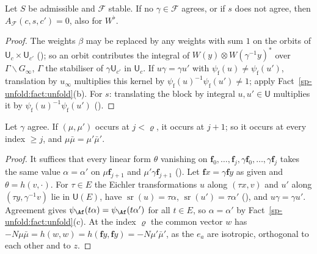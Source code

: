 \begin{lemma}\label{sp-unfold:lem:char}
Let $S$ be admissible and $\mathcal F$ stable. If no $\gamma\in\mathcal F$ agrees, or if $s$ does not agree, then
$A_{\mathcal F}(c,s,c')=0$, also for $W^\flat$.
\end{lemma}

\begin{proof}
The weights $\beta$ may be replaced by any weights with sum $1$ on the orbits of $\mathsf
U_c\times\mathsf U_{c'}$ (); so an orbit contributes
the integral of $W(y)\otimes W(\gamma^{-1}y)^*$ over $\Gamma\backslash G_\infty$, $\Gamma$ the
stabiliser of $\gamma\mathsf U_{c'}$ in $\mathsf U_c$. If $u\gamma=\gamma u'$ with
$\psi_{\mathrm f}(u)\ne\psi_{\mathrm f}(u')$, translation by $u_\infty$ multiplies this kernel by
$\psi_{\mathrm f}(u)^{-1}\psi_{\mathrm f}(u')\ne1$; apply Fact~\ref{sp-unfold:fact:unfold}(b). For $s$: translating the
block by integral $u,u'\in\mathsf U$ multiplies it by $\psi_{\mathrm f}(u)^{-1}\psi_{\mathrm f}(u')$
().
\end{proof}

\begin{lemma}\label{sp-unfold:lem:climb}
Let $\gamma$ agree. If $(\mu,\mu')$ occurs at $j<\varrho$, it occurs at $j+1$; so it occurs at every
index $\ge j$, and $\mu\bar\mu=\mu'\bar\mu'$.
\end{lemma}

\begin{proof}
It suffices that every linear form $\theta$ vanishing on $\mathbf f_0,\dots,\mathbf f_j,\gamma\mathbf
f_0,\dots,\gamma\mathbf f_j$ takes the same value $\alpha=\alpha'$ on $\mu\mathbf f_{j+1}$ and
$\mu'\gamma\mathbf f_{j+1}$ (). Let $\mathbf
fx=\gamma\mathbf fy$ as given and $\theta=h(v,\cdot)$. For $\tau\in E$ the Eichler transformations $u$
along $(\tau x,v)$ and $u'$ along $(\tau y,\gamma^{-1}v)$ lie in $\mathsf U(E)$, have
$\operatorname{sr}(u)=\tau\alpha$, $\operatorname{sr}(u')=\tau\alpha'$ (), and
$u\gamma=\gamma u'$. Agreement gives $\psi_{\Af}(t\alpha)=\psi_{\Af}(t\alpha')$ for all $t\in E$, so
$\alpha=\alpha'$ by Fact~\ref{sp-unfold:fact:unfold}(c). At the index $\varrho$
the common vector $w$ has $-N\mu\bar\mu=h(w,w)=h(\mathbf fy,\mathbf fy)=-N\mu'\bar\mu'$, as the $e_a$
are isotropic, orthogonal to each other and to $z$.
\end{proof}

